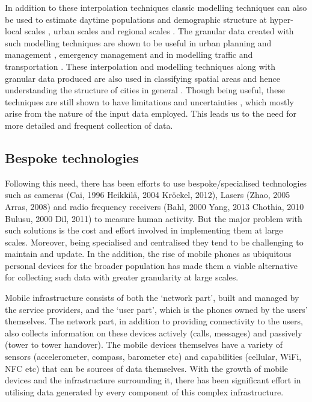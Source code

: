 In addition to these interpolation techniques classic modelling techniques can also be used to estimate daytime populations and demographic structure at hyper-local scales \citep{jochem2013, jia2014}, urban scales \citep{alahmadi2013, abowd2004} and regional scales \citep{foley1954, schmitt1956, singleton2015}.
The granular data created with such modelling techniques are shown to be useful in urban planning and management \citep{parrott1999}, emergency management \citep{alexander2002, cutter2006} and in modelling traffic and transportation \citep{lefebvre2013}.
These interpolation and modelling techniques along with granular data produced are also used in classifying spatial areas and hence understanding the structure of cities in general \citep{mcmillen2001, mcmillen2004, lee2007, arribas-bel2014}.
Though being useful, these techniques are still shown to have limitations and uncertainties \citep{nagle2014}, which mostly arise from the nature of the input data employed.
This leads us to the need for more detailed and frequent collection of data.

\subsection{Bespoke technologies}

Following this need, there has been efforts to use bespoke/specialised technologies such as cameras (Cai, 1996 Heikkilä, 2004 Kröckel, 2012), Lasers (Zhao, 2005 Arras, 2008) and radio frequency receivers  (Bahl, 2000 Yang, 2013 Chothia, 2010 Bulusu, 2000 Dil, 2011) to measure human activity.
But the major problem with such solutions is the cost and effort involved in implementing them at large scales.
Moreover, being specialised and centralised they tend to be challenging to maintain and update.
In the addition, the rise of mobile phones as ubiquitous personal devices for the broader population has made them a viable alternative for collecting such data with greater granularity at large scales.

Mobile infrastructure consists of both the ‘network part’, built and managed by the service providers, and the ‘user part’, which is the phones owned by the users’ themselves.
The network part, in addition to providing connectivity to the users, also collects information on these devices actively (calls, messages) and passively (tower to tower handover).
The mobile devices themselves have a variety of sensors (accelerometer, compass, barometer etc) and capabilities (cellular, WiFi, NFC etc) that can be sources of data themselves.
With the growth of mobile devices and the infrastructure surrounding it, there has been significant effort in utilising data generated by every component of this complex infrastructure.

